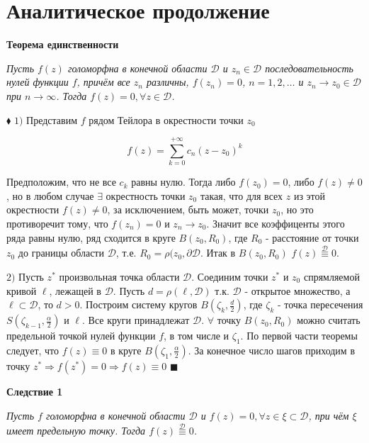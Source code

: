 \documentclass[a4paper, 12pt]{report}
\begin{document}
\section{Аналитическое продолжение}
\textbf{Теорема единственности}
\par\bigskip
\textsl{
Пусть $f(z)$ голоморфна в конечной области $\mathscr{D}$ и $z_n \in \mathscr{D}$ последовательность нулей функции $f$, причём все $z_n$ различны, $f(z_n) = 0$, $n = 1,2,\dots$ и $z_n \to z_0 \in \mathscr{D}$ при $n \to \infty$. Тогда $f(z) = 0, \forall z \in \mathscr{D}$.}
\par\bigskip
$\blacklozenge$ $1)$ Представим $f$ рядом Тейлора в окрестности точки $z_0$ 
\begin{center}
$$f(z) = \sum_{k = 0}^{+\infty} c_n (z - z_0)^k$$
\end{center}
\par\bigskip
Предположим, что не все $c_k$ равны нулю. Тогда либо $f(z_0) = 0$, либо $f(z) \not = 0$, но в любом случае $\exists$ окрестность точки $z_0$ такая, что для всех $z$ из этой окрестности $f(z) \not = 0$, за исключением, быть может, точки $z_0$, но это противоречит тому, что $f(z_n) = 0$ и $z_n \to z_0$. Значит все коэффиценты этого ряда равны нулю, ряд сходится в круге $B(z_0, R_0)$, где $R_0$ - расстояние от точки $z_0$ до границы области $\mathscr{D}$, т.е. $R_0 = \rho(z_0, \partial \mathscr{D}$. Итак в  $B(z_0, R_0)$ $f(z) \overset{\mathscr{D}}{\equiv} 0$.
\par
$2)$ Пусть $z^*$ произвольная точка области $\mathscr{D}$. Соединим точки $z^*$ и $z_0$ спрямляемой кривой $\ell$, лежащей в $\mathscr{D}$. Пусть $d = \rho(\ell, \mathscr{D})$ т.к. $\mathscr{D}$ - открытое множество, а $\ell \subset \mathscr{D}$, то $d > 0$. Построим систему кругов $B(\zeta_k, \frac{d}{2})$, где $\zeta_k$ - точка пересечения $S(\zeta_{k-1}, \frac{\alpha}{2})$ и $\ell$. Все круги принадлежат $\mathscr{D}$. $\forall$ точку $B(z_0, R_0)$ можно считать предельной точкой нулей функции $f$, в том числе и $\zeta_1$. По первой части теоремы следует, что $f(z) \equiv 0$ в круге $B(\zeta_1, \frac{\alpha}{2})$. За конечное число шагов приходим в точку $z^* \Rightarrow f(z^*) = 0 \Rightarrow f(z) \equiv 0$ $\blacksquare$
\par\bigskip
\textbf{Следствие 1}
\par\bigskip
\textsl{Пусть $f$ голоморфна в конечной области $\mathscr{D}$ и $f(z) = 0, \forall z \in \xi \subset \mathscr{D}$, при чём $\xi$ имеет предельную точку. Тогда $f(z) \overset{\mathscr{D}}{\equiv} 0$.}
\par\bigskip
\end{document}
